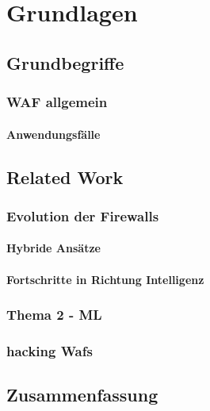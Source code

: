 \chapter{Grundlagen}


\section{Grundbegriffe}
\subsection{WAF allgemein}
\subsubsection{Anwendungsfälle}

\section{Related Work} %

\subsection{Evolution der Firewalls}

\subsubsection{Hybride Ansätze}


\subsubsection{Fortschritte in Richtung Intelligenz}


\subsection{Thema 2 - ML}


\subsection{hacking Wafs}


\section{Zusammenfassung}

